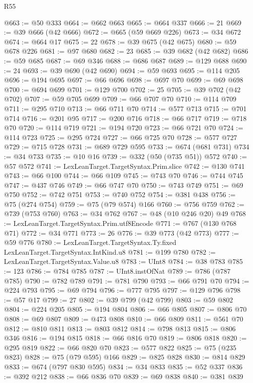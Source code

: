 \begin{lexlean}{R55}
\begin{coremodule}
{{{{{{{{{{{{{{{{{{{{{{{{{{{{{{{{{{{{{{{{{{{{{{{{{{{{{{{{{{{{{{{{{{{{{{{{{{{{{{{{@663 := @50 @333
@664 := @662 @663
@665 := @664 @337
@666 := 21
@669 := @39 @666 (@42 @666)
@672 := @665 (@59 @669 @226)
@673 := @34 @672
@674 := @664 @17
@675 := 22
@678 := @39 @675 (@42 @675)
@680 := @59 @678 @226
@681 := @97 @680
@682 := 23
@685 := @39 @682 (@42 @682)
@686 := @59 @685
@687 := @69 @346
@688 := @686 @687
@689 := @129 @688
@690 := 24
@693 := @39 @690 (@42 @690)
@694 := @59 @693
@695 := @114 @205
@696 := @194 @695
@697 := @66 @696
@698 := @697 @70
@699 := @69 @698
@700 := @694 @699
@701 := @129 @700
@702 := 25
@705 := @39 @702 (@42 @702)
@707 := @59 @705 @699
@709 := @66 @707 @70
@710 := @114 @709
@711 := @295 @710
@713 := @66 @711 @70
@714 := @577 @713
@715 := @701 @714
@716 := @201 @95
@717 := @200 @716
@718 := @66 @717
@719 := @718 @70
@720 := @114 @719
@721 := @194 @720
@723 := @66 @721 @70
@724 := @114 @723
@725 := @295 @724
@727 := @66 @725 @70
@728 := @577 @727
@729 := @715 @728
@731 := @689 @729 @595
@733 := @674 (@681 @731)
@734 := @34 @733
@735 := @10 @16
@739 := @332 (@50 (@735 @51)) @572
@740 := @57 @572
@741 := LexLeanTarget.TargetSyntax.Prim.slice
@742 := @130 @741
@743 := @66 @100
@744 := @66 @109
@745 := @743 @70
@746 := @744 @745
@747 := @437 @746
@749 := @66 @747 @70
@750 := @743 @749
@751 := @69 @750
@752 := @742 @751
@753 := @740 @752
@754 := @381 @438
@756 := @75 (@274 @754)
@759 := @75 (@79 @574) @166
@760 := @756 @759
@762 := @739 (@753 @760)
@763 := @34 @762
@767 := @48 (@10 @246 @20) @49
@768 := LexLeanTarget.TargetSyntax.Prim.utf8Encode
@771 := @767 (@130 @768 @71)
@772 := @34 @771
@773 := 26
@776 := @39 @773 (@42 @773)
@777 := @59 @776
@780 := LexLeanTarget.TargetSyntax.Ty.fixed LexLeanTarget.TargetSyntax.IntKind.u8
@781 := @199 @780
@782 := LexLeanTarget.TargetSyntax.Value.u8
@783 := UInt8
@784 := @38 @783
@785 := 123
@786 := @784 @785
@787 := UInt8.instOfNat
@789 := @786 (@787 @785)
@790 := @782 @789
@791 := @781 @790
@793 := @66 @791 @70
@794 := @224 @793
@795 := @69 @794
@796 := @777 @795
@797 := @129 @796
@798 := @57 @17
@799 := 27
@802 := @39 @799 (@42 @799)
@803 := @59 @802
@804 := @224 @205
@805 := @194 @804
@806 := @66 @805
@807 := @806 @70
@808 := @69 @807
@809 := @473 @808
@810 := @66 @809
@811 := @561 @70
@812 := @810 @811
@813 := @803 @812
@814 := @798 @813
@815 := @806 @346
@816 := @194 @815
@818 := @66 @816 @70
@819 := @806 @818
@820 := @295 @819
@822 := @66 @820 @70
@823 := @577 @822
@825 := @75 (@235 @823)
@828 := @75 (@79 @595) @166
@829 := @825 @828
@830 := @814 @829
@833 := @674 (@797 @830 @595)
@834 := @34 @833
@835 := @52 @337
@836 := @392 @212
@838 := @66 @836 @70
@839 := @69 @838
@840 := @381 @839
}}}}}}}}}}}}}}}}}}}}}}}}}}}}}}}}}}}}}}}}}}}}}}}}}}}}}}}}}}}}}}}}}}}}}}}}}}}}}}}}
\end{coremodule}
\end{lexlean}
